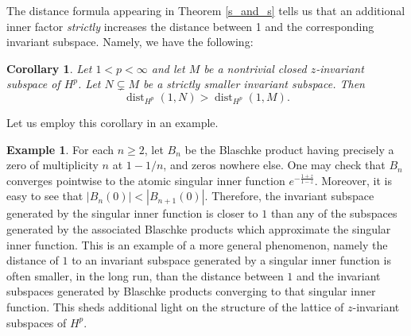 \documentclass{article}
\theoremstyle{plain}
\numberwithin{Theorem}{section}
\numberwithin{equation}{section}
\theoremstyle{plain}
\newtheorem{Corollary}[Theorem]{Corollary}
\theoremstyle{definition}
\newtheorem{Example}[Theorem]{Example}
\begin{document}
The distance formula appearing in Theorem \ref{s_and_s} tells us that an additional inner factor \textit{strictly} increases the distance between 1 and the corresponding invariant subspace. Namely, we have the following:
\begin{Corollary}\label{nested_spaces}
Let $ 1 < p < \infty$ and let $M$ be a nontrivial closed $z$-invariant subspace of $H^p$.  Let $N \subsetneq M$ be a strictly smaller invariant subspace.  Then 
\begin{equation*}
\operatorname{dist}_{H^p}(1, N)
     > \operatorname{dist}_{H^p}(1, M).
\end{equation*}
\end{Corollary}


Let us employ this corollary in an example. 
\begin{Example}
For each $n\ge2$, let $B_n$ be the Blaschke product having precisely a zero of multiplicity $n$ at $1 - 1/n$, and zeros nowhere else. One may check that $B_n$ converges pointwise to the atomic singular inner function $e^{-\frac{1+z}{1-z}}$.  Moreover, it is easy to see that $|B_n(0)| < |B_{n+1}(0)|$.
Therefore, the invariant subspace generated by the singular inner function is closer to $1$ than any of the subspaces generated by the associated Blaschke products which approximate the singular inner function. This is an example of a more general phenomenon, namely the distance of $1$ to an invariant subspace generated by a singular inner function is often smaller, in the long run, than the distance between $1$ and the invariant subspaces generated by Blaschke products converging to that singular inner function.  This sheds additional light on the structure of the lattice of $z$-invariant subspaces of $H^p$.
\end{Example}

\end{document}
